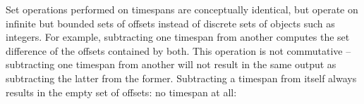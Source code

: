 \noindent Set operations performed on timespans are conceptually identical, but
operate on infinite but bounded sets of offsets instead of discrete sets of
objects such as integers. For example, subtracting one timespan from another
computes the set difference of the offsets contained by both. This operation is
not commutative -- subtracting one timespan from another will not result in the
same output as subtracting the latter from the former. Subtracting a timespan
from itself always results in the empty set of offsets: no timespan at all:

\begin{comment}
<abjad>
result = timespantools.Timespan(0, 10) - timespantools.Timespan(0, 10)
print(format(result))
result = timespantools.Timespan(0, 10) - timespantools.Timespan(5, 15)
print(format(result))
result = timespantools.Timespan(0, 10) - timespantools.Timespan(10, 20)
print(format(result))
result = timespantools.Timespan(5, 15) - timespantools.Timespan(0, 10)
print(format(result))
result = timespantools.Timespan(5, 15) - timespantools.Timespan(5, 15)
print(format(result))
result = timespantools.Timespan(5, 15) - timespantools.Timespan(10, 20)
print(format(result))
result = timespantools.Timespan(10, 20) - timespantools.Timespan(0, 10)
print(format(result))
result = timespantools.Timespan(10, 20) - timespantools.Timespan(5, 15)
print(format(result))
result = timespantools.Timespan(10, 20) - timespantools.Timespan(10, 20)
print(format(result))
</abjad>
\end{comment}

